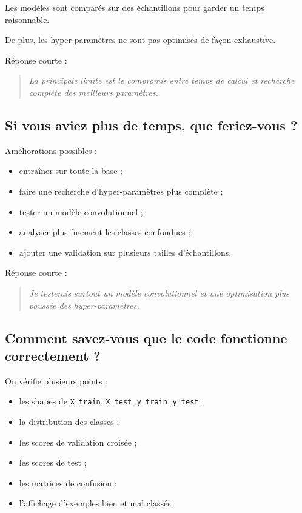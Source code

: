 \documentclass[11pt,a4paper]{article}
\begin{document}
Les modèles sont comparés sur des échantillons pour garder un temps raisonnable.

De plus, les hyper-paramètres ne sont pas optimisés de façon exhaustive.

Réponse courte :

\begin{quote}
\itshape La principale limite est le compromis entre temps de calcul et recherche complète des meilleurs paramètres.
\end{quote}

\subsection{Si vous aviez plus de temps, que feriez-vous ?}

Améliorations possibles :

\begin{itemize}
\item entraîner sur toute la base ;
\item faire une recherche d'hyper-paramètres plus complète ;
\item tester un modèle convolutionnel ;
\item analyser plus finement les classes confondues ;
\item ajouter une validation sur plusieurs tailles d'échantillons.
\end{itemize}

Réponse courte :

\begin{quote}
\itshape Je testerais surtout un modèle convolutionnel et une optimisation plus poussée des hyper-paramètres.
\end{quote}

\subsection{Comment savez-vous que le code fonctionne correctement ?}

On vérifie plusieurs points :

\begin{itemize}
\item les shapes de \texttt{X\_train}, \texttt{X\_test}, \texttt{y\_train}, \texttt{y\_test} ;
\item la distribution des classes ;
\item les scores de validation croisée ;
\item les scores de test ;
\item les matrices de confusion ;
\item l'affichage d'exemples bien et mal classés.
\end{itemize}
\end{document}
